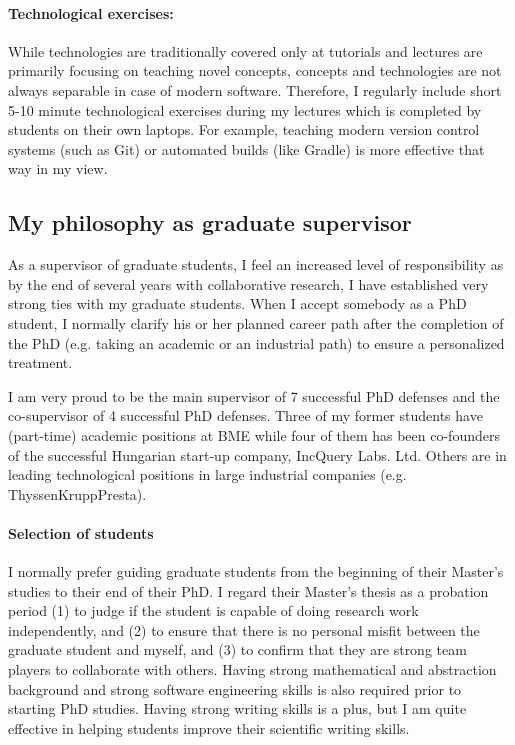 \paragraph{Technological exercises:}
While technologies are traditionally covered only at tutorials and lectures are primarily focusing on teaching novel concepts, concepts and technologies are not always separable in case of modern software. Therefore, I regularly include short 5-10 minute technological exercises during my lectures which is completed by students on their own laptops. For example, teaching modern version control systems (such as Git) or automated builds (like Gradle) is more effective that way in my view. 




\subsection{My philosophy as graduate supervisor}

As a supervisor of graduate students, I feel an increased level of responsibility as by the end of several years with collaborative research, I have established very strong ties with my graduate students. When I accept somebody as a PhD student, I normally clarify his or her planned career path after the completion of the PhD (e.g. taking an academic or an industrial path) to ensure a personalized treatment. 

I am very proud to be the main supervisor of 7 successful PhD defenses and the co-supervisor of 4 successful PhD defenses. Three of my former students have (part-time) academic positions at BME while four of them has been co-founders of the successful Hungarian start-up company, IncQuery Labs. Ltd. Others are in leading technological positions in large industrial companies (e.g. ThyssenKruppPresta).

\paragraph{Selection of students}
I normally prefer guiding graduate students from the beginning of their Master's studies to their end of their PhD. I regard their Master's thesis as a probation period (1) to judge if the student is capable of doing research work independently, and (2) to ensure that there is no personal misfit between the graduate student and myself, and (3) to confirm that they are strong team players to collaborate with others. Having strong mathematical and abstraction background and strong software engineering skills is also required prior to starting PhD studies. Having strong writing skills is a plus, but I am quite effective in helping students improve their scientific writing skills. 

